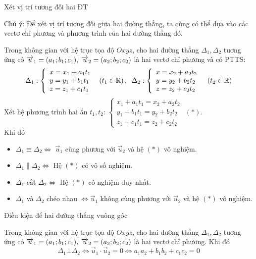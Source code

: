 \begin{dang}{Xét vị trí tương đối hai ĐT}
\begin{note} Chú ý: Để xét vị trí tương đối giữa hai đường thẳng, ta cũng có thể dựa vào các vectơ chỉ phương và phương trình của hai đường thẳng đó.
\end{note}
 Trong không gian với hệ trục tọa độ $Oxyz$, cho hai đường thẳng $\Delta _{1} ,\Delta _{2} $ tương ứng có $\overrightarrow{u}_{1} =(a_{1} ;b_{1} ;c_{1} ),{\rm \; }\overrightarrow{u}_{2} =(a_{2} ;b_{2} ;c_{2} )$ là hai vectơ chỉ phương và có PTTS:
\[\Delta _{1} :\left\{\begin{array}{l} {x=x_{1} +a_{1} t_{1} } \\ {y=y_{1} +b_{1} t_{1} } \\ {z=z_{1} +c_{1} t_{1} } \end{array}\right. {\rm \; }\left(t_{1} \in  \mathbb{R}\right),{\rm \; \; }\Delta _{2} :\left\{\begin{array}{l} {x=x_{2} +a_{2} t_{2} } \\ {y=y_{2} +b_{2} t_{2} } \\ {z=z_{2} +c_{2} t_{2} } \end{array}\right. {\rm \; \; }\left(t_{2} \in  \mathbb{R}\right)\] 
 Xét hệ phương trình hai ẩn $t_{1} ,t_{2} $: $\left\{\begin{array}{l} {x_{1} +a_{1} t_{1} =x_{2} +a_{2} t_{2} } \\ {y_{1} +b_{1} t_{1} =y_{2} +b_{2} t_{2} } \\ {z_{1} +c_{1} t_{1} =z_{2} +c_{2} t_{2} } \end{array}\right. $ \quad$\left(*\right)$.\\
 Khi đó
\begin{itemize}
	\item  $\Delta _{1} \equiv \Delta _{2} \Leftrightarrow $ $\overrightarrow{u}_{1} $ cùng phương với $\overrightarrow{u}_{2} $ và hệ $\left(*\right)$ vô nghiệm.
	\item  $\Delta _{1} \parallel \Delta _{2} \Leftrightarrow $ Hệ $\left(*\right)$ có vô số nghiệm.
	\item  $\Delta _{1} $ cắt $\Delta _{2} \Leftrightarrow $ Hệ $\left(*\right)$ có nghiệm duy nhất.
	\item  $\Delta _{1} $ và $\Delta _{2} $ chéo nhau $\Leftrightarrow \overrightarrow{u}_{1} $ không cùng phương với $\overrightarrow{u}_{2} $ và hệ $\left(*\right)$ vô nghiệm.
\end{itemize}

\begin{note}
	Điều kiện để hai đường thẳng vuông góc
\end{note}

 Trong không gian với hệ trục tọa độ $Oxyz$, cho hai đường thẳng $\Delta _{1} ,\Delta _{2} $ tương ứng có $\overrightarrow{u}_{1} =(a_{1} ;b_{1} ;c_{1} ),{\rm \; }\overrightarrow{u}_{2} =(a_{2} ;b_{2} ;c_{2} )$ là hai vectơ chỉ phương. Khi đó
\[\Delta _{1} \bot \Delta _{2} \Leftrightarrow \overrightarrow{u}_{1} \cdot\overrightarrow{u}_{2} =0\Leftrightarrow a_{1} a_{2} +b_{1} b_{2} +c_{1} c_{2} =0\] 
\end{dang}
